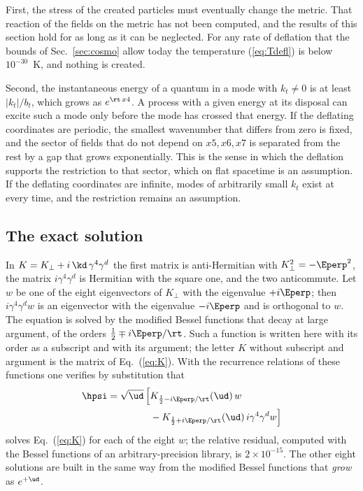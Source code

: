 First, the stress of the created particles must eventually change the metric. That reaction of the
fields on the metric has not been computed, and the results of this section hold for as long as it
can be neglected. For any rate of deflation that the bounds of Sec.~\ref{sec:cosmo} allow today the
temperature (\ref{eq:Tdefl}) is below $10^{-30}$~K, and nothing is created.

Second, the instantaneous energy of a quantum in a mode with $k_t\ne0$ is at least $|k_t|/b_t$,
which grows as $e^{\rt\,x4}$. A process with a given energy at its disposal can excite such a mode
only before the mode has crossed that energy. If the deflating coordinates are periodic, the
smallest wavenumber that differs from zero is fixed, and the sector of fields that do not depend on
$x5,x6,x7$ is separated from the rest by a gap that grows exponentially. This is the sense in which
the deflation supports the restriction to that sector, which on flat spacetime is an assumption. If the
deflating coordinates are infinite, modes of arbitrarily small $k_t$ exist at every time, and the
restriction remains an assumption.
\subsection{The exact solution}

In $K=K_\perp+i\,\kd\,\gamma^{4}\gamma^{d}$ the first matrix is anti-Hermitian with
$K_\perp^{2}=-\Eperp^{2}$, the matrix $i\gamma^{4}\gamma^{d}$ is Hermitian with the square one, and
the two anticommute. Let $w$ be one of the eight eigenvectors of $K_\perp$ with the eigenvalue
$+i\Eperp$; then $i\gamma^{4}\gamma^{d}w$ is an eigenvector with the eigenvalue $-i\Eperp$ and is
orthogonal to $w$. The equation is solved by the modified Bessel functions that decay at large
argument, of the orders $\tfrac12\mp i\Eperp/\rt$. Such a function is written here with its order
as a subscript and with its argument; the letter $K$ without subscript and argument is the matrix of
Eq.~(\ref{eq:K}). With the recurrence relations of these functions one verifies by substitution that
\begin{equation}
\begin{aligned}
\hpsi=\sqrt{\ud}\,\Big[&K_{\frac12-i\Eperp/\rt}(\ud)\,w\\
&-K_{\frac12+i\Eperp/\rt}(\ud)\,i\gamma^{4}\gamma^{d}w\Big]
\end{aligned}
\label{eq:exact}
\end{equation}
solves Eq.~(\ref{eq:K}) for each of the eight $w$; the relative residual, computed with the Bessel
functions of an arbitrary-precision library, is $2\times10^{-15}$. The other eight solutions are built in
the same way from the modified Bessel functions that \emph{grow} as $e^{+\ud}$.

